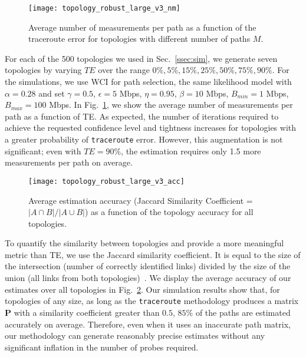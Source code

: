 \documentclass[final,5p,times,twocolumn]{elsarticle}
\begin{document}
\begin{figure} [!h]
\centering
\texttt{[image: topology\_robust\_large\_v3\_nm]}
\caption{Average number of measurements per path as a function of the traceroute error for topologies with different number of paths $M$.\label{fig:nm_large_v3}}
\end{figure}

For each of the 500 topologies we used in Sec.~\ref{ssec:sim}, we generate seven topologies by varying $TE$ over the range $0\%, 5\%,15\%,25\%,50\%,75\%, 90\%$.  
For the simulations, we use WCI for path selection, the same likelihood model with $\alpha=0.28$ and set $\gamma = 0.5$, $\epsilon = 5$ Mbps, $\eta = 0.95$, $\beta = 10$ Mbps, $B_{min} = 1$ Mbps, $B_{max} = 100$ Mbps. 
In Fig.~\ref{fig:nm_large_v3}, we show the average number of measurements per path as a function of TE. 
As expected, the number of iterations required to achieve the requested confidence level and tightness increases for topologies with a greater probability of \texttt{traceroute} error.
However, this augmentation is not significant; even with $TE=90\%$, the estimation requires only 1.5 more measurements per path on average.

\begin{figure} [!h]
\centering
\texttt{[image: topology\_robust\_large\_v3\_acc]}
\caption{Average estimation accuracy (Jaccard Similarity Coefficient = $|A \cap B| / |A \cup B|$) as a function of the topology accuracy for all topologies. \label{fig:acc_large_v3}}
\end{figure}

To quantify the similarity between topologies and provide a more meaningful metric than TE, we use the Jaccard similarity coefficient. It is equal to the size of the intersection (number of correctly identified links) divided by the size of the union (all links from both topologies)~\cite{jac:1901}.
We display the average accuracy of our estimates over all topologies in Fig.~\ref{fig:acc_large_v3}.  
Our simulation results show that, for topologies of any size, as long as the \texttt{traceroute} methodology produces a matrix $\mathbf{P}$ with a similarity coefficient greater than $0.5$, $85\%$ of the paths are estimated accurately on average.  Therefore, even when it uses an inaccurate path matrix, our methodology can generate reasonably precise estimates without any significant inflation in the number of probes required.
\end{document}
